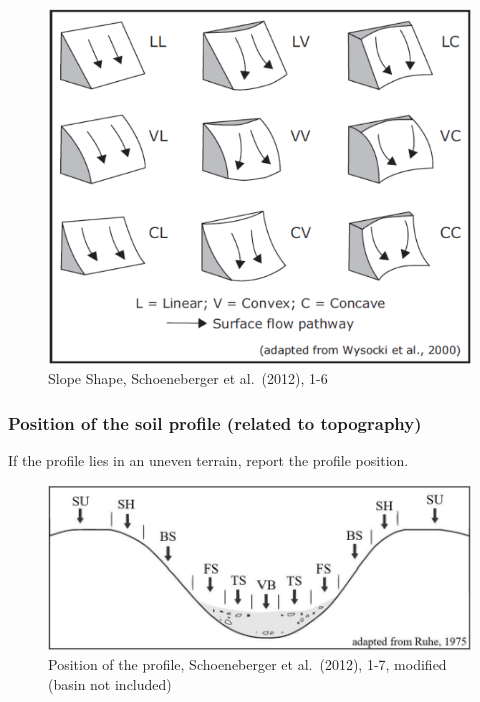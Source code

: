 \documentclass[
  letterpaper,
  DIV=11,
  numbers=noendperiod]{scrreprt}
\begin{document}
\begin{figure}

{\centering \includegraphics{./figure_8-8.png}

}

\caption{Slope Shape, Schoeneberger et al.~(2012), 1-6}

\end{figure}

\hypertarget{position-of-the-soil-profile-related-to-topography}{%
\subsubsection{Position of the soil profile (related to
topography)}\label{position-of-the-soil-profile-related-to-topography}}

If the profile lies in an uneven terrain, report the profile position.

\begin{figure}

{\centering \includegraphics{./figure_8-9.png}

}

\caption{Position of the profile, Schoeneberger et al.~(2012), 1-7,
modified (basin not included)}

\end{figure}
\end{document}
